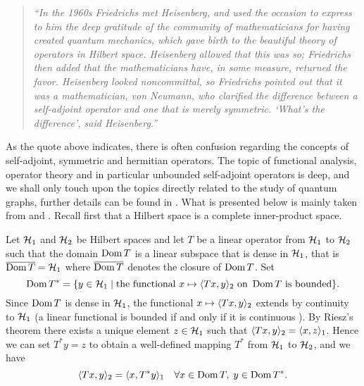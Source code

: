 \begin{quote}\itshape
  ``In the 1960s Friedrichs met Heisenberg, and used the occasion to express to him the deep gratitude of the community of mathematicians for having created quantum mechanics, which gave birth to the beautiful theory of operators in Hilbert space. Heisenberg allowed that this was so; Friedrichs then added that the mathematicians have, in some measure, returned the favor. Heisenberg looked noncommittal, so Friedrichs pointed out that it was a mathematician, von Neumann, who clarified the difference between a self-adjoint operator and one that is merely symmetric. `What's the difference', said Heisenberg.'' \normalfont\cite[p.~414]{lax}
\end{quote}

As the quote above indicates, there is often confusion regarding the concepts of self-adjoint, symmetric and hermitian operators. The topic of functional analysis, operator theory and in particular unbounded self-adjoint operators is deep, and we shall only touch upon the topics directly related to the study of quantum graphs, further details can be found in \cite{teschl-fa, teschl-schroe, schmudgen}. What is presented below is mainly taken from \cite[section 1.2]{schmudgen} and \cite[section 5.1]{pedersen}. Recall first that a Hilbert space is a complete inner-product space.

Let $\mathcal{H}_1$ and $\mathcal{H}_2$ be Hilbert spaces and let $T$ be a linear operator from $\mathcal{H}_1$ to $\mathcal{H}_2$ such that the domain $\operatorname{Dom} T$ is a linear subspace that is dense in $\mathcal{H}_1$, that is $\overline{\operatorname{Dom} T} = \mathcal{H}_1$ where $\overline{\operatorname{Dom} T}$ denotes the closure of $\operatorname{Dom} T$. Set
\[
  \operatorname{Dom} T^* = \{y \in \mathcal{H}_1 \mid \text{the functional } x \mapsto \langle Tx, y \rangle_2 \text{ on } \operatorname{Dom} T \text{ is bounded} \}.
\]
Since $\operatorname{Dom} T$ is dense in $\mathcal{H}_1$, the functional $x \mapsto \langle Tx, y \rangle_2$ extends by continuity to $\mathcal{H}_1$ (a linear functional is bounded if and only if it is continuous \cite[theorem 4.4.2]{friedman}). By Riesz's theorem \cite[theorem 6.2.4]{friedman} there exists a unique element $z \in \mathcal{H}_1$ such that $\langle Tx, y \rangle_2 = \langle x, z \rangle_1$. Hence we can set $T^*y = z$ to obtain a well-defined mapping $T^*$ from $\mathcal{H}_1$ to $\mathcal{H}_2$, and we have
\begin{equation}\label{eq: adjoint symmetric relation}
  \langle Tx, y \rangle_2 = \langle x, T^*y \rangle_1 \quad \forall x \in \operatorname{Dom} T, \; y \in \operatorname{Dom} T^*.
\end{equation}

